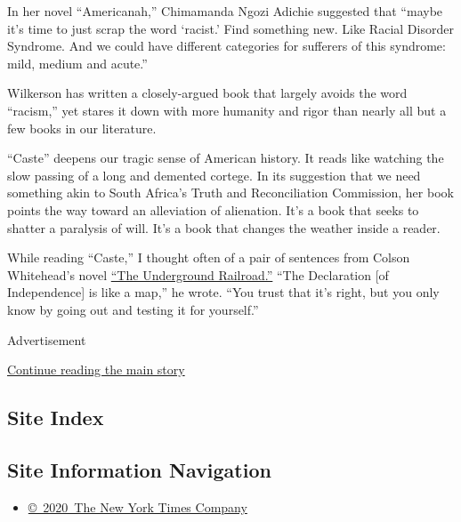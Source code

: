 In her novel ``Americanah,'' Chimamanda Ngozi Adichie suggested that
``maybe it's time to just scrap the word `racist.' Find something new.
Like Racial Disorder Syndrome. And we could have different categories
for sufferers of this syndrome: mild, medium and acute.''

Wilkerson has written a closely-argued book that largely avoids the word
``racism,'' yet stares it down with more humanity and rigor than nearly
all but a few books in our literature.

``Caste'' deepens our tragic sense of American history. It reads like
watching the slow passing of a long and demented cortege. In its
suggestion that we need something akin to South Africa's Truth and
Reconciliation Commission, her book points the way toward an alleviation
of alienation. It's a book that seeks to shatter a paralysis of will.
It's a book that changes the weather inside a reader.

While reading ``Caste,'' I thought often of a pair of sentences from
Colson Whitehead's novel
\href{https://www.nytimes.com/2016/08/03/books/review-the-underground-railroad-colson-whitehead.html}{``The
Underground Railroad.''} ``The Declaration {[}of Independence{]} is like
a map,'' he wrote. ``You trust that it's right, but you only know by
going out and testing it for yourself.''

Advertisement

\protect\hyperlink{after-bottom}{Continue reading the main story}

\hypertarget{site-index}{%
\subsection{Site Index}\label{site-index}}

\hypertarget{site-information-navigation}{%
\subsection{Site Information
Navigation}\label{site-information-navigation}}

\begin{itemize}
\tightlist
\item
  \href{https://help.nytimes.com/hc/en-us/articles/115014792127-Copyright-notice}{©~2020~The
  New York Times Company}
\end{itemize}

